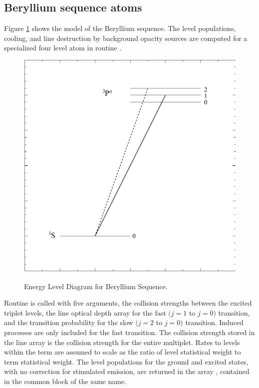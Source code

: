 \subsection{Beryllium sequence atoms}

Figure \ref{fig:AtomBeSequence} shows the model of the Beryllium sequence.
The level populations, cooling, and line destruction by background opacity
sources are computed for a specialized four level atom in routine
.

\begin{figure}
\centering
\includegraphics[scale=0.5]{AtomBeSequence}
\label{fig:AtomBeSequence}
\caption{Energy Level Diagram for Beryllium Sequence.}
\end{figure}

Routine  is called with five arguments, the collision strengths
between the excited triplet levels, the line optical depth array for the
fast $(j=1$ to $j=0)$ transition, and the transition probability for the slow
$(j=2$ to $j=0)$ transition. Induced processes are only included for the fast
transition.   The collision strength stored in the line array is the
collision strength for the entire multiplet.  Rates to levels within the
term are assumed to scale as the ratio of level statistical weight to term
statistical weight.  The level populations for the ground and excited states,
with no correction for stimulated emission, are returned in the array
, contained in the common block of the same name.

